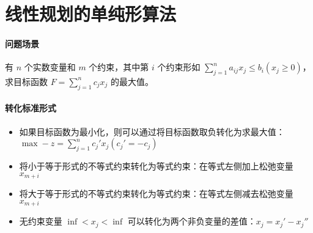 \section{线性规划的单纯形算法}

\paragraph{问题场景} 有 $n$ 个实数变量和 $m$ 个约束，其中第 $i$ 个约束形如 $\sum_{j=1}^n a_{ij}x_j \le b_i (x_j \ge 0)$，求目标函数 $F = \sum_{j=1}^n c_jx_j$ 的最大值。

\paragraph{转化标准形式}

\begin{itemize}
    \item 如果目标函数为最小化，则可以通过将目标函数取负转化为求最大值：$\max -z = \sum_{j=1}^n c_j'x_j (c_j' = -c_j)$
    \item 将小于等于形式的不等式约束转化为等式约束：在等式左侧加上松弛变量 $x_{m+i}$
    \item 将大于等于形式的不等式约束转化为等式约束：在等式左侧减去松弛变量 $x_{m+i}$
    \item 无约束变量 $\inf < x_j < \inf$ 可以转化为两个非负变量的差值：$x_j = x_j' - x_j''$
\end{itemize}

